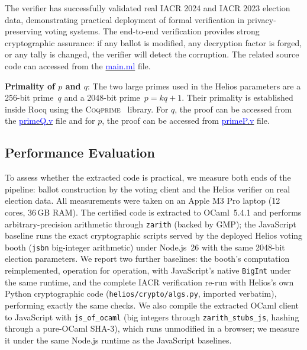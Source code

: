 The verifier has successfully validated real IACR 2024 and IACR 2023 election data, demonstrating practical deployment 
of formal verification in privacy-preserving voting systems. The end-to-end verification provides strong 
cryptographic assurance: if any ballot is modified, any decryption factor is forged, or any tally is 
changed, the verifier will detect the corruption. The related source code can accessed 
from the \href{https://anonymous.4open.science/r/SigmaProtocol-EBA5/src/Executable/HeliosVerifiercode/main.ml}{\textcolor{blue}{main.ml}} file.


\textbf{Primality of $p$ and $q$}:
The two large primes used in the Helios parameters are a 256-bit prime~$q$
and a 2048-bit prime~$p = kq + 1$.
Their primality is established inside Rocq using the
\textsc{Coqprime}~\cite{thery2007primality} library.  For $q$, the proof can be accessed from the \href{https://anonymous.4open.science/r/SigmaProtocol-EBA5/src/Examples/primeQ.v}{\textcolor{blue}{primeQ.v}} file and 
for $p$, the proof can be accessed from \href{https://anonymous.4open.science/r/SigmaProtocol-EBA5/src/Examples/primeP.v}{\textcolor{blue}{primeP.v}} file.  



  


\subsection{Performance Evaluation}\label{perf_eval}
To assess whether the extracted code is practical, we measure both ends of the pipeline: ballot construction by the voting client and the Helios verifier on real election data. All measurements were taken on an Apple M3 Pro laptop (12 cores, 36\,GB RAM). The certified code is extracted to OCaml~5.4.1 and performs arbitrary-precision arithmetic through \texttt{zarith} (backed by GMP); the JavaScript baseline runs the exact cryptographic scripts served by the deployed Helios voting booth (\texttt{jsbn} big-integer arithmetic) under Node.js~26 with the same 2048-bit election parameters. We report two further baselines: the booth's computation reimplemented, operation for operation, with JavaScript's native \texttt{BigInt} under the same runtime, and the complete IACR verification re-run with Helios's own Python cryptographic code (\texttt{helios/crypto/algs.py}, imported verbatim), performing exactly the same checks. We also compile the extracted OCaml client to JavaScript with \texttt{js\_of\_ocaml} (big integers through \texttt{zarith\_stubs\_js}, hashing through a pure-OCaml SHA-3), which runs unmodified in a browser; we measure it under the same Node.js runtime as the JavaScript baselines.

